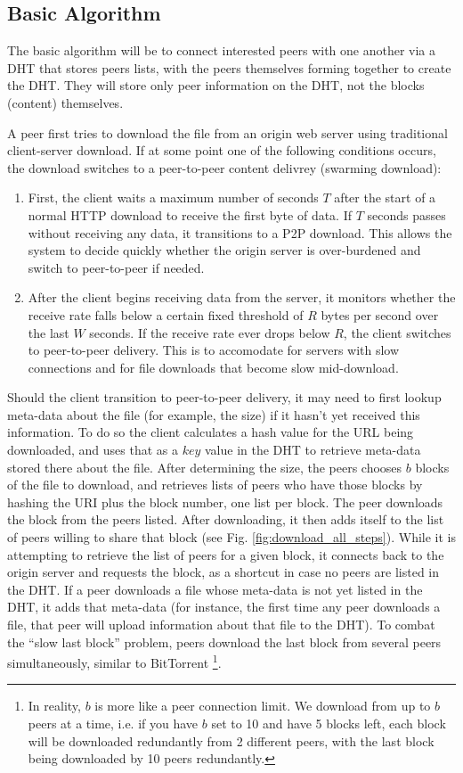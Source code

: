 \subsection{Basic Algorithm}

The basic algorithm will be to connect interested peers with one another via a DHT that stores peers lists, with the peers themselves forming together to create the DHT.
They will store only peer information on the DHT, not the blocks (content) themselves.

A peer first tries to download the file from an origin web server using traditional client-server download.  If at some point one of the following conditions occurs, the download switches to a 
peer-to-peer content delivrey (swarming download):
\begin{enumerate}
\item First, the client waits a maximum number of seconds $T$ after the start of a normal HTTP download to receive the first byte of data.  
If $T$ seconds passes without receiving any data, it transitions to a P2P download.  
This allows the system to decide quickly whether the origin server is over-burdened and switch to peer-to-peer if needed.   
\item After the client begins receiving data from the server, it monitors whether the receive rate falls below a certain fixed 
threshold of $R$ bytes per second over the last $W$ seconds.  If the receive rate ever drops below $R$, the client switches to peer-to-peer delivery.  
This is to accomodate for servers with slow connections and for file downloads that become slow mid-download.
\end{enumerate}

Should the client transition to peer-to-peer delivery, it may need to first lookup meta-data about the file (for example, the size) if it 
hasn't yet received this information.  To do so the client calculates a hash value for the URL being downloaded, and uses that as a $key$ value in the 
DHT to retrieve meta-data stored there about the file.  After determining the size, the peers chooses $b$ blocks of the file to download, and retrieves lists of peers 
who have those blocks by hashing the URI plus the block number, one list per block.  
The peer downloads the block from the peers listed.  After downloading, 
it then adds itself to the list of peers willing to share that block (see Fig. \ref{fig:download_all_steps}).  While it is attempting to retrieve the list of peers for a given block, 
it connects back to the origin server and requests the block, as a shortcut in case no peers are listed in the DHT.  If a peer downloads a file whose meta-data 
is not yet listed in the DHT, it adds that meta-data (for instance, the first time any peer downloads a file, that peer will upload information about that file to the DHT).
To combat the ``slow last block'' problem,  peers download the last block from several peers simultaneously, similar to 
BitTorrent \footnote{In reality, $b$ is more like a peer connection limit.  We download from up to $b$ peers at a time, i.e. if you have $b$ set to 10 and have 5 blocks left, 
each block will be downloaded redundantly from 2 different peers, with the last block being downloaded by 10 peers redundantly.}.

